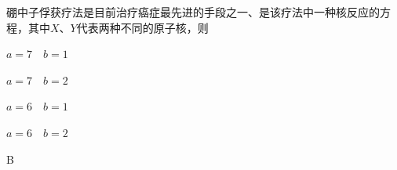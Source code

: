 硼中子俘获疗法是目前治疗癌症最先进的手段之一、是该疗法中一种核反应的方程，其中\(X\)、\(Y\)代表两种不同的原子核，则\paren[]
\begin{choices}
	\item \(a = 7\quad b = 1\)
	\item \(a = 7\quad b = 2\)
	\item \(a = 6\quad b = 1\)
	\item \(a = 6\quad b = 2\)
\end{choices}
\begin{answer}
	B
\end{answer}